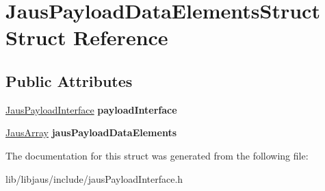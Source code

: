 \hypertarget{struct_jaus_payload_data_elements_struct}{\section{\-Jaus\-Payload\-Data\-Elements\-Struct \-Struct \-Reference}
\label{struct_jaus_payload_data_elements_struct}
}
\subsection*{\-Public \-Attributes}
\begin{DoxyCompactItemize}
\item 
\hypertarget{struct_jaus_payload_data_elements_struct_acda1b40f8faa14abcf6a82e653a7f34c}{\hyperlink{struct_jaus_payload_interface_struct}{\-Jaus\-Payload\-Interface} {\bfseries payload\-Interface}}\label{struct_jaus_payload_data_elements_struct_acda1b40f8faa14abcf6a82e653a7f34c}

\item 
\hypertarget{struct_jaus_payload_data_elements_struct_ad2ba490b0f7f3f648e1939483cb3854c}{\hyperlink{struct_jaus_array_struct}{\-Jaus\-Array} {\bfseries jaus\-Payload\-Data\-Elements}}\label{struct_jaus_payload_data_elements_struct_ad2ba490b0f7f3f648e1939483cb3854c}

\end{DoxyCompactItemize}


\-The documentation for this struct was generated from the following file\-:\begin{DoxyCompactItemize}
\item 
lib/libjaus/include/jaus\-Payload\-Interface.\-h\end{DoxyCompactItemize}
